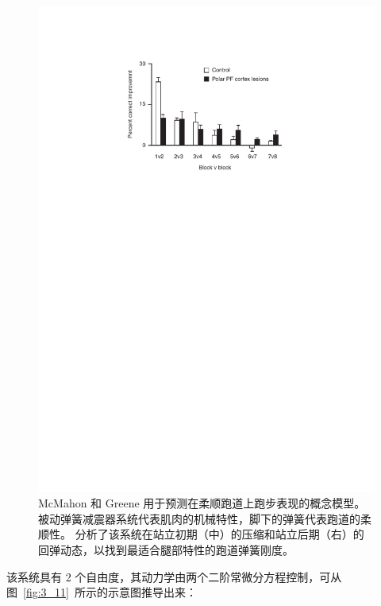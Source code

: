 \begin{figure}[!htb]
	\centering
	\includegraphics[width=1.0\linewidth]{chap3/3_10}
	\caption{McMahon 和 Greene 用于预测在柔顺跑道上跑步表现的概念模型。
		被动弹簧减震器系统代表肌肉的机械特性，脚下的弹簧代表跑道的柔顺性。
		分析了该系统在站立初期（中）的压缩和站立后期（右）的回弹动态，以找到最适合腿部特性的跑道弹簧刚度\cite{mcmahon1979influence}。 \label{fig:3_10}}
\end{figure}

该系统具有 2 个自由度，其动力学由两个二阶常微分方程控制，可从图~\ref{fig:3_11}~所示的示意图推导出来：

